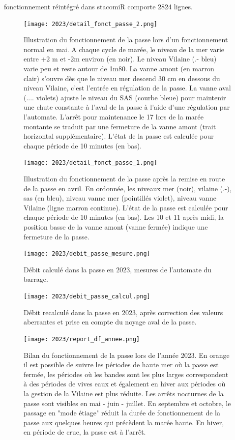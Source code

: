 \documentclass[11pt,twocolumn,titlepage,twoside]{article}\usepackage[]{graphicx}\usepackage[]{color}
\begin{document}
fonctionnement réintégré dans stacomiR comporte
\textcolor{orange_EV}{\num{2824}} lignes.
\begin{figure}[htpb]
\centering
\texttt{[image: 2023/detail\_fonct\_passe\_2.png]}
\caption{Illustration du fonctionnement de la passe lors d'un fonctionnement
normal en mai. A chaque cycle de marée, le niveau de la mer varie entre +2 m et
-2m environ (en noir). Le niveau Vilaine (.- bleu) varie peu et reste
autour de 1m80. La vanne amont (en marron clair) s'ouvre  dès que le niveau mer
descend 30 cm en dessous du niveau Vilaine, c'est l'entrée en régulation de la
passe. La vanne aval (.... violets) ajuste le niveau du SAS (courbe bleue)
pour maintenir une chute constante à l'aval de la passe à l'aide d'une
régulation par l'automate. 
 L'arrêt pour maintenance le 17 lors de la marée montante se traduit par une
 fermeture de la vanne amont (trait horizontal supplémentaire). L'état de la
 passe est calculée pour chaque période de 10 minutes (en bas).
}
\label{detail_fonct_passe_2}
\end{figure}


\begin{figure}[htpb]
\centering
\texttt{[image: 2023/detail\_fonct\_passe\_1.png]}
\caption{Illustration du fonctionnement de la passe après la remise en route
de la passe en avril. En ordonnée, les niveaux mer (noir), vilaine
(.-), sas (en bleu), niveau vanne mer (pointillés violet), niveau vanne Vilaine (ligne marron
continue). L'état de la passe est calculée pour chaque période de 10 minutes (en bas).
Les 10 et 11 après midi, la position basse de la vanne amont (vanne fermée)
indique une fermeture de la passe.}
\label{detail_fonct_passe_1}
\end{figure}


\begin{figure}[ht]
\centering
\texttt{[image: 2023/debit\_passe\_mesure.png]}
\caption{Débit calculé dans la passe en 2023, mesures de l'automate du barrage.}
\label{debit_passe_mesure}
\end{figure}


\begin{figure}[ht]
\centering
\texttt{[image: 2023/debit\_passe\_calcul.png]}
\caption{Débit recalculé dans la passe en 2023, après correction des valeurs
aberrantes et prise en compte du noyage aval de la passe.}
\label{debit_passe_calcul}
\end{figure}


\begin{figure}[hp]
\centering
\texttt{[image: 2023/report\_df\_annee.png]} 
\caption{Bilan du fonctionnement de la passe lors de l'année 2023. En orange
il est possible de suivre les périodes de haute mer où la passe est fermée, les
périodes où les bandes sont les plus larges correspondent à des périodes de
vives eaux et également en hiver aux périodes où la gestion de la
Vilaine est plus réduite. Les arrêts nocturnes de la passe sont visibles en mai
- juin - juillet. En septembre et octobre, le passage en "mode étiage" réduit la
durée de fonctionnement de la passe aux quelques heures qui précèdent la marée
haute. En hiver, en période de crue, la passe est à l'arrêt.}
\label{report_df_annee}
\end{figure}
\end{document}
